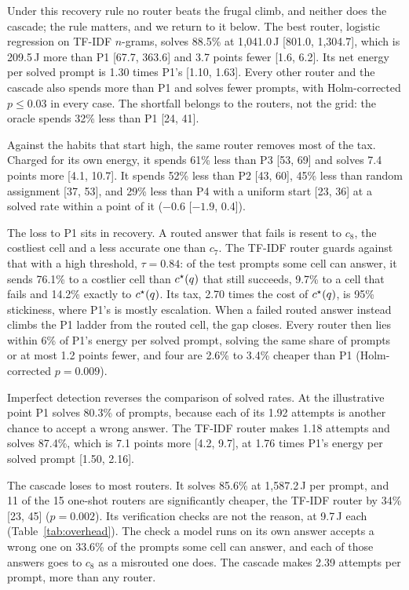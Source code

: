 Under this recovery rule no router beats the frugal climb, and neither does
the cascade; the rule matters, and we return to it below. The best
router, logistic regression on TF-IDF $n$-grams, solves 88.5\% at
1{,}041.0\,J [801.0, 1{,}304.7], which is 209.5\,J more than P1 [67.7,
363.6] and 3.7 points fewer [1.6, 6.2]. Its net energy per solved prompt is
1.30 times P1's [1.10, 1.63]. Every other router and the cascade also spends
more than P1 and solves fewer prompts, with Holm-corrected $p \leq 0.03$ in
every case. The shortfall belongs to the routers, not the grid: the oracle
spends 32\% less than P1 [24, 41].

Against the habits that start high, the same router removes most of the
tax. Charged for its own energy, it spends 61\% less than P3 [53, 69] and
solves 7.4 points more [4.1, 10.7]. It spends 52\% less than P2 [43, 60],
45\% less than random assignment [37, 53], and 29\% less than P4 with a
uniform start [23, 36] at a solved rate within a point of it ($-0.6$
[$-1.9$, 0.4]).

The loss to P1 sits in recovery. A routed answer that fails is resent to
$c_8$, the costliest cell and a less accurate one than $c_7$. The TF-IDF
router guards against that with a high threshold, $\tau = 0.84$: of the
test prompts some cell can answer, it sends 76.1\% to a costlier cell than
$c^{\star}(q)$ that still succeeds, 9.7\% to a cell that fails and 14.2\%
exactly to $c^{\star}(q)$. Its tax, 2.70 times the cost of $c^{\star}(q)$, is
95\% stickiness, where P1's is mostly escalation. When a failed routed
answer instead climbs the P1 ladder from the routed cell, the gap closes.
Every router then lies within 6\% of P1's energy per solved prompt, solving
the same share of prompts or at most 1.2 points fewer, and four are 2.6\% to
3.4\% cheaper than P1 (Holm-corrected $p = 0.009$).

Imperfect detection reverses the comparison of solved rates. At the
illustrative point P1 solves 80.3\% of prompts, because each of its 1.92
attempts is another chance to accept a wrong answer. The TF-IDF router makes
1.18 attempts and solves 87.4\%, which is 7.1 points more [4.2, 9.7], at 1.76
times P1's energy per solved prompt [1.50, 2.16].

The cascade loses to most routers. It solves 85.6\% at 1{,}587.2\,J per
prompt, and 11 of the 15 one-shot routers are significantly cheaper, the
TF-IDF router by
34\% [23, 45] ($p = 0.002$). Its verification checks are not the reason, at
9.7\,J each (Table~\ref{tab:overhead}). The check a model runs on its own
answer accepts a wrong one on 33.6\% of the prompts some cell can answer,
and each of those answers goes to $c_8$ as a misrouted one does. The cascade
makes 2.39 attempts per prompt, more than any router.

